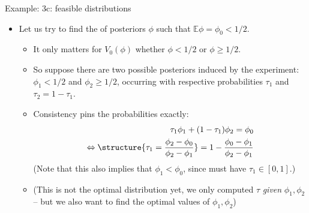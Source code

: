 \documentclass[english,10pt
,aspectratio=169
]{beamer}
\begin{document}
\begin{frame}{Example: 3c: feasible distributions}
\begin{itemize}
	\item Let us try to find the  of posteriors $\phi$ such that $\mathbb{E} \phi = \phi_0 < 1/2$.
	\begin{itemize}
		\item It only matters for $V_0(\phi)$ whether $\phi < 1/2$ or $\phi \geq 1/2$.
		\item So suppose there are two possible posteriors induced by the experiment: $\phi_1 < 1/2$ and $\phi_2 \geq 1/2$, occurring with respective probabilities $\tau_1$ and $\tau_2 = 1 - \tau_1$. 
		\item Consistency pins the probabilities exactly:
		\begin{align} \nonumber
			\tau_1 \phi_1 + (1-\tau_1) \phi_2 = \phi_0
			\\ \label{eq:ID_cons}
			\Leftrightarrow \structure{\tau_1 = \frac{\phi_2 - \phi_0}{\phi_2 - \phi_1}} = 1 - \frac{\phi_0 - \phi_1}{\phi_2 - \phi_1}
		\end{align}
		(Note that this also implies that $\phi_1 < \phi_0$, since must have $\tau_1 \in [0,1]$.)
		\item (This is not the optimal distribution yet, we only computed $\tau$ \emph{given} $\phi_1,\phi_2$ -- but we also want to find the optimal values of $\phi_1,\phi_2$)
	\end{itemize}
\end{itemize}
\end{frame}
\end{document}
